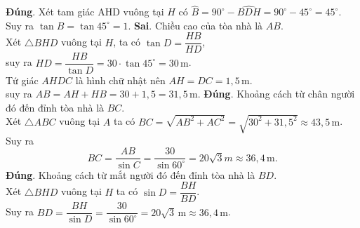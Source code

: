 \begin{ex}
{\begin{center}
\begin{tikzpicture}[scale=.38, font=\footnotesize, line join=round, >=stealth]
	\end{tikzpicture}
	\end{center}
	\begin{itemchoice}
	\itemch \textbf{Đúng}. Xét tam giác AHD vuông tại $H$ có $\widehat{B} = 90^\circ - \widehat{BDH} = 90^\circ - 45^\circ = 45^\circ$.\\
	Suy ra $\tan B = \tan 45^\circ = 1$. 
	\itemch \textbf{Sai}. Chiều cao của tòa nhà là $AB$.\\
	Xét $\triangle BHD$ vuông tại $H$, ta có $\tan D = \dfrac{HB}{HD}$,\\
	suy ra $HD = \dfrac{HB}{\tan D} = 30 \cdot \tan 45^\circ = 30\,\mathrm{m}$.\\
	Tứ giác $AHDC$ là hình chữ nhật nên $AH = DC = 1{,}5\,\mathrm{m}$.\\
	suy ra $AB = AH + HB = 30 + 1{,}5 = 31{,}5\,\mathrm{m}$. 
	\itemch \textbf{Đúng}. Khoảng cách từ chân người đó đến đỉnh tòa nhà là $BC$.\\
	Xét $\triangle ABC$ vuông tại $A$ ta có $BC = \sqrt{AB^2 + AC^2} = \sqrt{30^2 + 31{,}5^2} \approx 43{,}5\,\mathrm{m}$.\\
	Suy ra 
	$$BC = \dfrac{AB}{\sin C} = \dfrac{30}{\sin 60^\circ} = 20\sqrt{3} m \approx 36{,}4\,\mathrm{m}.$$ 
	\itemch \textbf{Đúng}. Khoảng cách từ mắt người đó đến đỉnh tòa nhà là $BD$.\\
	Xét $\triangle BHD$ vuông tại $H$ ta có $\sin D = \dfrac{BH}{BD}$.\\
	Suy ra $BD = \dfrac{BH}{\sin D} = \dfrac{30}{\sin 60^\circ} = 20\sqrt{3}\,\mathrm{m} \approx 36{,}4\,\mathrm{m}$.
	\end{itemchoice}
	}
\end{ex}
